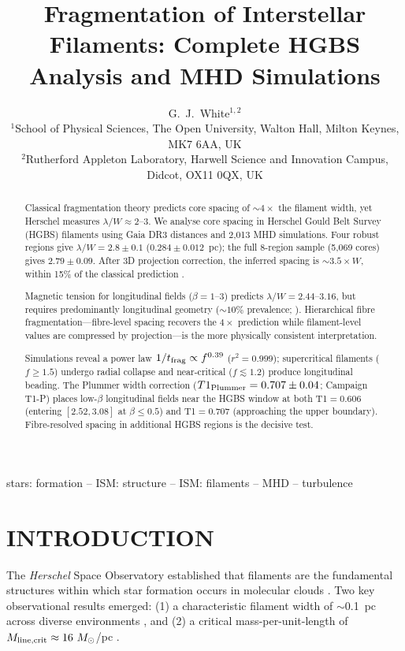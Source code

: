 \documentclass[twoside,twocolumn]{mnras}
\title{Fragmentation of Interstellar Filaments: Complete HGBS Analysis and MHD Simulations}
\author[G.~J.~White]{G.~J.~White$^{1,2}$\\
$^{1}$School of Physical Sciences, The Open University, Walton Hall, Milton Keynes, MK7 6AA, UK\\
$^{2}$Rutherford Appleton Laboratory, Harwell Science and Innovation Campus, Didcot, OX11 0QX, UK}
\begin{document}
\maketitle

\begin{abstract}
Classical fragmentation theory predicts core spacing of ${\sim}4\times$ the filament
width, yet Herschel measures $\lambda/W \approx 2$--$3$. We analyse core spacing in
Herschel Gould Belt Survey (HGBS) filaments using Gaia DR3 distances and 2,013 MHD
simulations. Four robust regions give $\lambda/W = 2.8 \pm 0.1$
($0.284 \pm 0.012$~pc); the full 8-region sample (5,069 cores) gives $2.79 \pm 0.09$.
After 3D projection correction, the inferred spacing is ${\sim}3.5\times W$, within
15\% of the classical prediction \citep{Inutsuka1992}.

Magnetic tension for longitudinal fields ($\beta = 1$--$3$) predicts
$\lambda/W = 2.44$--$3.16$, but requires predominantly longitudinal geometry
(${\sim}10\%$ prevalence; \citealt{Planck2016}).
Hierarchical fibre fragmentation---fibre-level spacing recovers the $4\times$ prediction
\citep{Yang2024} while filament-level values are compressed by projection---is the more
physically consistent interpretation.

Simulations reveal a power law $1/t_{\rm frag} \propto f^{0.39}$ ($r^2 = 0.999$);
supercritical filaments ($f \geq 1.5$) undergo radial collapse \citep{Nagasawa1987}
and near-critical ($f \lesssim 1.2$) produce longitudinal beading.
The Plummer width correction ($T1_{\rm Plummer} = 0.707 \pm 0.04$; Campaign T1-P)
places low-$\beta$ longitudinal fields near the HGBS window at both T1$=0.606$
(entering $[2.52, 3.08]$ at $\beta \leq 0.5$) and T1$=0.707$ (approaching the upper
boundary). Fibre-resolved spacing in additional HGBS regions is the decisive test.
\end{abstract}

\begin{keywords}
stars: formation -- ISM: structure -- ISM: filaments -- MHD -- turbulence
\end{keywords}

\section{INTRODUCTION}

The \textit{Herschel} Space Observatory established that filaments are the fundamental
structures within which star formation occurs in molecular clouds \citep{Andre2010}.
Two key observational results emerged: (1) a characteristic filament width of $\sim$0.1~pc
across diverse environments \citep{Arzoumanian2011}, and (2) a critical mass-per-unit-length
of $M_{\rm line,crit} \approx 16~M_\odot$/pc \citep{Ostriker1964}.
\end{document}
